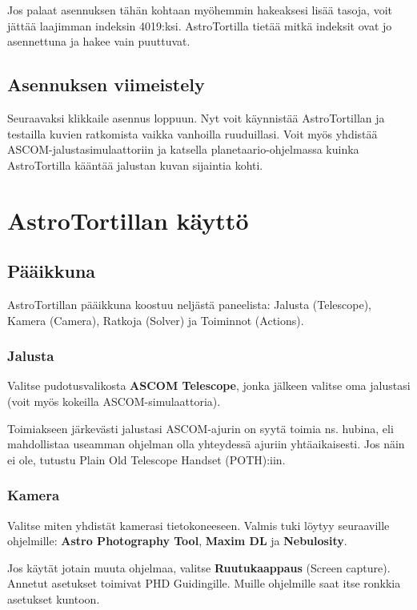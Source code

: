 \documentclass{article}
\begin{document}
Jos palaat asennuksen tähän kohtaan myöhemmin hakeaksesi lisää tasoja, voit jättää laajimman indeksin 4019:ksi. 
AstroTortilla tietää mitkä indeksit ovat jo asennettuna ja hakee vain puuttuvat.

\subsection{Asennuksen viimeistely}

Seuraavaksi klikkaile asennus loppuun. Nyt voit käynnistää AstroTortillan ja testailla kuvien ratkomista vaikka vanhoilla ruuduillasi.
Voit myös yhdistää ASCOM-jalustasimulaattoriin ja katsella planetaario-ohjelmassa kuinka AstroTortilla kääntää jalustan kuvan sijaintia kohti.

\section{AstroTortillan käyttö}

\subsection{Pääikkuna}

AstroTortillan pääikkuna koostuu neljästä paneelista: Jalusta (Telescope), Kamera (Camera), Ratkoja (Solver) ja Toiminnot (Actions).

\subsubsection{Jalusta}

Valitse pudotusvalikosta \textbf{ASCOM Telescope}, jonka jälkeen valitse oma jalustasi (voit myös kokeilla ASCOM-simulaattoria).

Toimiakseen järkevästi jalustasi ASCOM-ajurin on syytä toimia ns. hubina, 
eli mahdollistaa useamman ohjelman olla yhteydessä ajuriin yhtäaikaisesti.
Jos näin ei ole, tutustu Plain Old Telescope Handset (POTH):iin.

\subsubsection{Kamera}

Valitse miten yhdistät kamerasi tietokoneeseen. Valmis tuki löytyy seuraaville ohjelmille: \textbf{Astro Photography Tool}, \textbf{Maxim DL} ja \textbf{Nebulosity}.

Jos käytät jotain muuta ohjelmaa, valitse \textbf{Ruutukaappaus} (Screen capture). Annetut asetukset toimivat PHD Guidingille. 
Muille ohjelmille saat itse ronkkia asetukset kuntoon.
\end{document}
